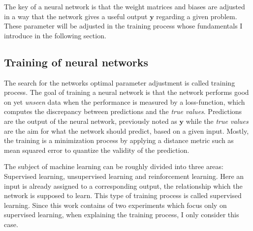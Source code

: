 The key of a neural network is that the weight matrices and biases are adjusted in a way that the network gives a useful output $\textbf{y}$ regarding a given problem. These parameter will be adjusted in the training process whose fundamentals I introduce in the following section.

\subsection{Training of neural networks}
The search for the networks optimal parameter adjustment is called training process. The goal of training a neural network is that the network performs good on yet \textit{unseen} data when the performance is measured by a loss-function, which computes the discrepancy between predictions and the \textit{true values}. Predictions are the output of the neural network, previously noted as $\textbf{y}$ while the \textit{true values} are the aim for what the network should predict, based on a given input. Mostly, the training is a minimization process by applying a distance metric such as mean squared error to quantize the validity of the prediction.

The subject of machine learning can be roughly divided into three areas: Supervised learning, unsupervised learning and reinforcement learning.
Here an input is already assigned to a corresponding output, the relationship which the network is supposed to learn. This type of training process is called supervised learning. Since this work contains of two experiments which focus only on supervised learning, when explaining the training process, I only consider this case.



